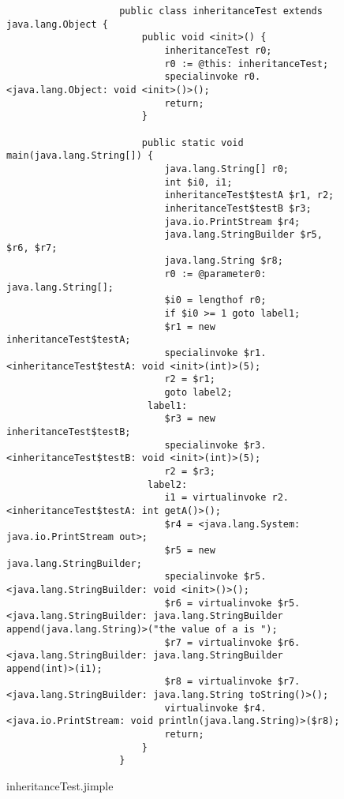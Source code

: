 \documentclass{dithesis}
\begin{document}
            \begin{figure}[H]
                \begin{lstlisting}
                    public class inheritanceTest extends java.lang.Object {
                        public void <init>() {
                            inheritanceTest r0;
                            r0 := @this: inheritanceTest;
                            specialinvoke r0.<java.lang.Object: void <init>()>();
                            return;
                        }

                        public static void main(java.lang.String[]) {
                            java.lang.String[] r0;
                            int $i0, i1;
                            inheritanceTest$testA $r1, r2;
                            inheritanceTest$testB $r3;
                            java.io.PrintStream $r4;
                            java.lang.StringBuilder $r5, $r6, $r7;
                            java.lang.String $r8;
                            r0 := @parameter0: java.lang.String[];
                            $i0 = lengthof r0;
                            if $i0 >= 1 goto label1;
                            $r1 = new inheritanceTest$testA;
                            specialinvoke $r1.<inheritanceTest$testA: void <init>(int)>(5);
                            r2 = $r1;
                            goto label2;
                         label1:
                            $r3 = new inheritanceTest$testB;
                            specialinvoke $r3.<inheritanceTest$testB: void <init>(int)>(5);
                            r2 = $r3;
                         label2:
                            i1 = virtualinvoke r2.<inheritanceTest$testA: int getA()>();
                            $r4 = <java.lang.System: java.io.PrintStream out>;
                            $r5 = new java.lang.StringBuilder;
                            specialinvoke $r5.<java.lang.StringBuilder: void <init>()>();
                            $r6 = virtualinvoke $r5.<java.lang.StringBuilder: java.lang.StringBuilder append(java.lang.String)>("the value of a is ");
                            $r7 = virtualinvoke $r6.<java.lang.StringBuilder: java.lang.StringBuilder append(int)>(i1);
                            $r8 = virtualinvoke $r7.<java.lang.StringBuilder: java.lang.String toString()>();
                            virtualinvoke $r4.<java.io.PrintStream: void println(java.lang.String)>($r8);
                            return;
                        }
                    }
                \end{lstlisting}
            \caption{inheritanceTest.jimple}
            \end{figure}
\end{document}
